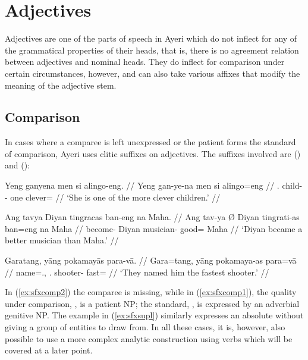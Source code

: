 \xe



\section{Adjectives}

Adjectives are one of the parts of speech in Ayeri which do not inflect for any 
of the grammatical properties of their heads, that is, there is no agreement 
relation between adjectives and nominal heads. They do inflect for comparison 
under certain circumstances, however, and can also take various affixes that 
modify the meaning of the adjective stem.

\subsection{Comparison}

In cases where a comparee is left unexpressed or the patient forms the 
standard of comparison, Ayeri uses clitic suffixes on adjectives. The suffixes 
involved are  (\Comp{}) and  (\Supl{}):

\pex\label{ex:sfxcomp}
\a\label{ex:sfxcomp2}\begingl
	\gla Yeng ganyena men si alingo-eng. //
	\glb Yeng gan-ye-na men si alingo=eng //
	\glc \TsgF{}.\Aarg{} child-\Pl{}-\Gen{} one \Rel{} clever=\Comp{} //
	\glft `She is one of the more clever children.' //
\endgl

\a\label{ex:sfxcomp1}\begingl
	\gla Ang tavya {} Diyan tingracas ban-eng na Maha. //
	\glb Ang tav-ya Ø Diyan tingrati-as ban=eng na Maha //
	\glc \AgtT{} become-\TsgM{} \Top{} Diyan musician-\Parg{} good=\Comp{} 
		\Gen{} Maha //
	\glft `Diyan became a better musician than Maha.' //
\endgl


\a\label{ex:sfxsupl}\begingl
	\gla Garatang, yāng pokamayās para-vā. //
	\glb Gara=tang, yāng pokamaya-as para=vā //
	\glc name=\TplM{}.\Aarg{}, \TsgM.\Aarg{} shooter-\Parg{} fast=\Supl{} //
	\glft `They named him the fastest shooter.' //
\endgl\xe

In (\ref{ex:sfxcomp2}) the comparee is missing, while in (\ref{ex:sfxcomp1}), 
the quality under comparison, , is a patient NP; the standard, , is 
expressed by an adverbial genitive NP. The example in (\ref{ex:sfxsupl}) 
similarly expresses an absolute without giving a group of entities to draw 
from. 
In all these cases, it is, however, also possible to use a more complex 
analytic construction using verbs which will be covered at a later point.

